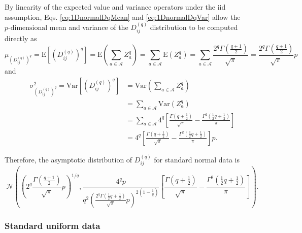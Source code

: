 \documentclass[10pt,letterpaper]{article}\usepackage[]{graphicx}\usepackage[]{color}
\begin{document}
By linearity of the expected value and variance operators under the iid assumption, Eqs. \ref{eq:1DnormalDqMean} and \ref{eq:1DnormalDqVar} allow the $p\text{-dimensional}$ mean and variance of the $D^{(q)}_{ij}$ distribution to be computed directly as
%
\begin{equation}\label{eq:normalDqMean}
\mu_{\left(D^{(q)}_{ij}\right)^q} = \text{E}\left[\left(D^{(q)}_{ij}\right)^q\right] = \text{E}\left(\sum_{a \in \mathcal{A}} Z^q_a\right) = \sum_{a \in \mathcal{A}} \text{E}\left(Z^q_a\right) = \sum_{a \in \mathcal{A}} \frac{2^q \Gamma\left(\frac{q + 1}{2}\right)}{\sqrt{\pi}} = \frac{2^q\Gamma\left(\frac{q + 1}{2}\right)}{\sqrt{\pi}}p
\end{equation}
%
and
%
\begin{equation}\label{eq:normalVar}
\begin{split}
\sigma^2_{\left(D^{(q)}_{ij}\right)^q} = \text{Var}\left[\left(D^{(q)}_{ij}\right)^q\right] &= \text{Var}\left(\sum_{a \in \mathcal{A}} Z^q_a\right) \\
&= \sum_{a \in \mathcal{A}} \text{Var}\left(Z^q_a\right) \\
&= \sum_{a \in \mathcal{A}} 4^{q}\left[\frac{\Gamma\left(q + \frac{1}{2}\right)}{\sqrt{\pi}} - \frac{\Gamma^2\left(\frac{1}{2}q + \frac{1}{2}\right)}{\pi}\right] \\
&= 4^{q}\left[\frac{\Gamma\left(q + \frac{1}{2}\right)}{\sqrt{\pi}} - \frac{\Gamma^2\left(\frac{1}{2}q + \frac{1}{2}\right)}{\pi}\right]p.
\end{split}
\end{equation}

Therefore, the asymptotic distribution of $D^{(q)}_{ij}$ for standard normal data is
%
\begin{equation}\label{eq:normalDistr}
\mathcal{N}\left(\left(2^q\frac{\Gamma\left(\frac{q + 1}{2}\right)}{\sqrt{\pi}}p\right)^{1/q},
\frac{4^q p}{q^2 \left(\frac{2^q \Gamma\left(\frac{1}{2}q + \frac{1}{2}\right)}{\sqrt{\pi}}p\right)^{2\left(1 - \frac{1}{q}\right)}}\left[\frac{\Gamma\left(q + \frac{1}{2}\right)}{\sqrt{\pi}} - \frac{\Gamma^2\left(\frac{1}{2}q + \frac{1}{2}\right)}{\pi}\right]\right).
\end{equation}

\subsubsection{Standard uniform data}
\end{document}
